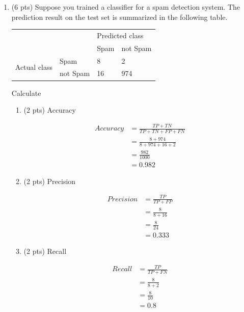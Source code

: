\documentclass[a4paper]{article}
\theoremstyle{definition}
\newenvironment{soln}{
    \leavevmode\color{blue}\ignorespaces
}{}
\begin{document}
\begin{enumerate}
\item (6 pts) Suppose you trained a classifier for a spam detection system. The prediction result on the test set is summarized in the following table.
\begin{center}
	\begin{tabular}{l l | l l}
		&          & \multicolumn{2}{l}{Predicted class} \\
		&          & Spam           & not Spam           \\
		\hline
		\multirow{2}{*}{Actual class} & Spam     & 8              & 2                  \\
		& not Spam & 16             & 974               
	\end{tabular}
\end{center}

Calculate
\begin{enumerate}
	\item (2 pts) Accuracy
	\begin{soln}  

		$$
		\begin{align}
		Accuracy 
		&= \frac{TP + TN}{TP + TN + FP + FN} \\
		&= \frac{8 + 974}{8 + 974 + 16 + 2} \\
		&= \frac{982}{1000} \\
		&= 0.982
		\end{align}
		$$
	
	\end{soln}
	\item (2 pts) Precision
	\begin{soln}  

		$$
		\begin{align}
		Precision &= \frac{TP}{TP + FP} \\
		&= \frac{8}{8 + 16} \\
		&= \frac{8}{24} \\
		&= 0.333
		\end{align}
		$$
	
	\end{soln}
	\item (2 pts) Recall
	\begin{soln}  

		$$
		\begin{align}
		Recall &= \frac{TP}{TP + FN} \\
		&= \frac{8}{8 + 2} \\
		&= \frac{8}{10} \\
		&= 0.8
		\end{align}
		$$
	

\end{soln}
\end{enumerate}
\end{enumerate}
\end{document}

